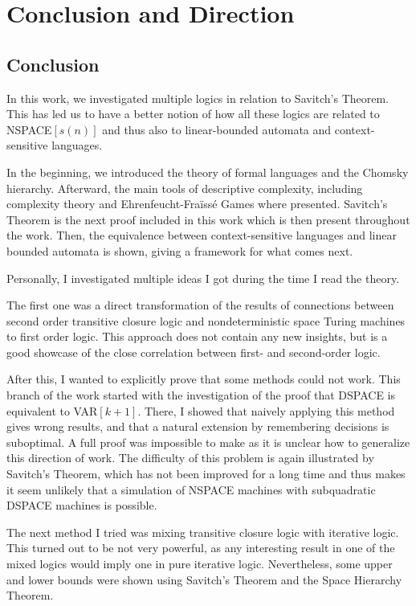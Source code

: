 \chapter{Conclusion and Direction}\label{ch:conclusion-and-direction}

\section{Conclusion}\label{sec:conclusion}
In this work, we investigated multiple logics in relation to Savitch's Theorem.
This has led us to have a better notion of how all these logics are related to NSPACE$[s(n)]$ and thus also to linear-bounded automata and context-sensitive languages.

In the beginning, we introduced the theory of formal languages and the Chomsky hierarchy.
Afterward, the main tools of descriptive complexity, including complexity theory and Ehrenfeucht-Fraïssé Games where presented.
Savitch's Theorem is the next proof included in this work which is then present throughout the work.
Then, the equivalence between context-sensitive languages and linear bounded automata is shown, giving a framework for what comes next.

Personally, I investigated multiple ideas I got during the time I read the theory.

The first one was a direct transformation of the results of connections between second order transitive closure logic and nondeterministic space Turing machines to first order logic.
This approach does not contain any new insights, but is a good showcase of the close correlation between first- and second-order logic.

After this, I wanted to explicitly prove that some methods could not work.
This branch of the work started with the investigation of the proof that DSPACE is equivalent to VAR$[k + 1]$.
There, I showed that naively applying this method gives wrong results, and that a natural extension by remembering decisions is suboptimal.
A full proof was impossible to make as it is unclear how to generalize this direction of work.
The difficulty of this problem is again illustrated by Savitch's Theorem, which has not been improved for a long time and thus makes it seem unlikely that a simulation of NSPACE machines with subquadratic DSPACE machines is possible.

The next method I tried was mixing transitive closure logic with iterative logic.
This turned out to be not very powerful, as any interesting result in one of the mixed logics would imply one in pure iterative logic.
Nevertheless, some upper and lower bounds were shown using Savitch's Theorem and the Space Hierarchy Theorem.


